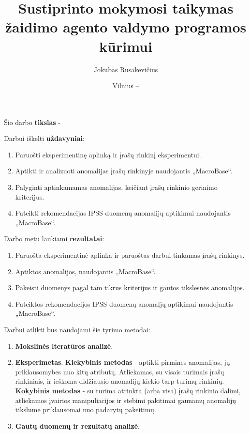 \documentclass{VUMIFPSbakalaurinis}
\title{Sustiprinto mokymosi taikymas žaidimo agento valdymo programos kūrimui}
\author{Jokūbas Rusakevičius}
\date{Vilnius – \the\year}
\begin{document}
\maketitle

\setcounter{page}{2}





Šio darbo \textbf{tikslas} - \par

Darbui iškelti \textbf{uždavyniai}:\par

\begin{enumerate}
	\item Paruošti eksperimentinę aplinką ir įrašų rinkinį eksperimentui.
	\item Aptikti ir analizuoti anomalijas įrašų rinkinyje naudojantis „MacroBase“.
	\item Palyginti aptinkamamas anomalijas, keičiant įrašų rinkinio gerinimo kriterijus.
	\item Pateikti rekomendacijas IPSS duomenų anomalijų aptikimui naudojantis „MacroBase“.
\end{enumerate}

Darbo metu laukiami \textbf{rezultatai}:

\begin{enumerate}
	\item Paruošta eksperimentinė aplinka ir paruoštas darbui tinkamas įrašų rinkinys.
	\item Aptiktos anomalijos, naudojantis „MacroBase“.
	\item Pakeisti duomenys pagal tam tikrus kriterijus ir gautos tikslesnės anomalijos.
	\item Pateiktos rekomendacijos IPSS duomenų anomaljų aptikimui naudojantis „MacroBase“.
\end{enumerate}

Darbui atlikti bus naudojami šie tyrimo metodai:

\begin{enumerate}
	\item \textbf{Mokslinės lteratūros analizė}.
	\item \textbf{Eksperimetas}.
	\subitem \textbf{Kiekybinis metodas} - aptikti pirmines anomalijas, jų priklausomybes nuo kitų atributų. Atliekamas, su visais turimais įrašų rinkiniais, ir ieškoma didžiausio anomalijų kiekio tarp turimų rinkinių.
	\subitem \textbf{Kokybinis metodas} - su turima atrinkta (arba visa) įrašų rinkinio dalimi, atliekamos įvairios manipuliacijos ir stebimi pakitimai gaunamų anomalijų tikslume priklausomai nuo padarytų pakeitimų. 
	\item \textbf{Gautų duomenų ir rezultatų analizė}.
\end{enumerate}
\end{document}
